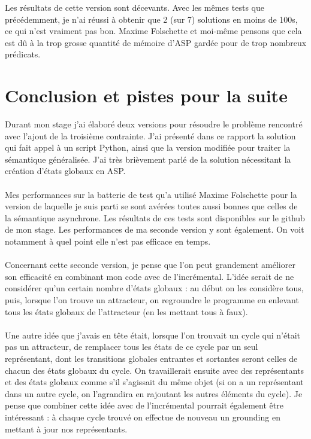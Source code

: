 \documentclass[10pt,a4paper]{article}
\begin{document}
Les résultats de cette version sont décevants. Avec les mêmes tests que précédemment, je n'ai réussi à obtenir que 2 (sur 7) solutions en moins de 100s, ce qui n'est vraiment pas bon. Maxime Folschette et moi-même pensons que cela 
est dû à la trop grosse quantité de mémoire d'ASP gardée pour de trop nombreux prédicats.

\newpage
\section{Conclusion et pistes pour la suite}
Durant mon stage j'ai élaboré deux versions pour résoudre le problème rencontré avec l'ajout de la troisième contrainte. J'ai présenté dans ce rapport la solution qui fait appel à un script Python, ainsi que la version modifiée 
pour traiter la sémantique généralisée. J'ai très brièvement parlé de la solution nécessitant la création d'états globaux en ASP.\\ \\
Mes performances sur la batterie de test qu'a utilisé Maxime Folschette pour la version de laquelle je suis parti se sont avérées toutes aussi bonnes que celles de la sémantique asynchrone. Les résultats de ces tests sont 
disponibles sur le github de mon stage. Les performances de ma seconde version y sont également. On voit notamment à quel point elle n'est pas efficace en temps.\\ \\
Concernant cette seconde version, je pense que l'on peut grandement améliorer son efficacité en combinant mon code avec de l'incrémental. L'idée serait de ne considérer qu'un certain nombre d'états globaux : au début on les 
considère tous, puis, lorsque l'on trouve un attracteur, on regroundre le programme en enlevant tous les états globaux de l'attracteur (en les mettant tous à faux).\\ \\
Une autre idée que j'avais en tête était, lorsque l'on trouvait un cycle qui n'était pas un attracteur, de remplacer tous les états de ce cycle par un seul représentant, dont les transitions globales entrantes et sortantes 
seront celles de chacun des états globaux du cycle. On travaillerait ensuite avec des représentants et des états globaux comme s'il s'agissait du même objet (si on a un représentant dans un autre cycle, on l'agrandira en rajoutant 
les autres éléments du cycle). Je pense que combiner cette idée avec de l'incrémental pourrait également être intéressant : à chaque cycle trouvé on effectue de nouveau un grounding en mettant à jour nos représentants.\\ \\
\end{document}
